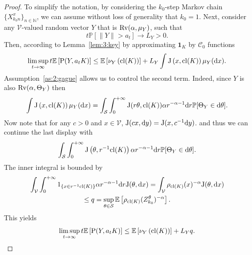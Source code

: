 \documentclass[preprint,12pt]{elsarticle}
\theoremstyle{definition}
\theoremstyle{remark}
\newcommand{\xbf}{{ x}}
\newcommand{\ybf}{{ y}}
\newcommand{\Xbf}{{ X}}
\newcommand{\Ybf}{{ Y}}
\newcommand{\Zbf}{{ Z}}
\newcommand{\1}{{\mathbf 1}}
\numberwithin{equation}{section}
\newcommand{\Ebb}{\mathbb{E}}  %
\newcommand{\Nbb}{\mathbb{N}}
\newcommand{\Pbb}{\mathbb{P}}
\newcommand{\ud}{{\rm d}}
\newcommand{\Prm}{{\rm P}}
\newcommand{\Krm}{{\rm J}}
\newcommand{\Rvrm}{{\rm Rv}}
\newcommand{\Vcal}{\mathcal{V}}
\newcommand{\Scal}{\mathcal{S}}
\begin{document}
  \begin{proof}
    To simplify the notation, by considering the $k_0$-step Markov chain 
    $\{\Xbf_{k_0n}^\xbf\}_{n \in \Nbb}$, we can assume without loss of 
    generality that $k_0=1$. Next, consider any $\Vcal$-valued random 
    vector $\Ybf$ that is $\Rvrm(\alpha, \mu_\Ybf)$, such that
    \begin{equation*}
      t \Pbb[\| \Ybf\| > a_t] \to L_\Ybf > 0.
    \end{equation*}
    Then, according to Lemma~\ref{lem:3:key} by approximating $\mathbf{1}_K$ 
	by $\mathcal{C}_0$ functions
	\begin{equation*}
      \limsup_{t \to \infty} t \Ebb\left[\Prm(\Ybf, a_tK)\right] \leq 
      \Ebb \left[\nu_{\Ybf}\left(\mathrm{cl}(K)\right) \right] +
      L_\Ybf \int \Krm\left(\xbf,\mathrm{cl}(K)\right) \mu_\Ybf(\ud \xbf).
	\end{equation*}
	Assumption~\ref{as:2:gague} allows us to control the second term. 
    Indeed, since $\Ybf$ is 
	also $\Rvrm(\alpha,\Theta_\Ybf)$ then
	\begin{equation*}
      \int \Krm\left(\xbf, \mathrm{cl}(K) \right) \mu_\Ybf(\ud \xbf) = 
      \int_\Scal \int_0^{+\infty} 
      \Krm(r \theta,\mathrm{cl}(K)) \alpha r^{-\alpha -1}\ud r 
      \Pbb[\Theta_\Ybf \in \ud \theta].
	\end{equation*}
    Now note that for any $c>0$ and 
	$\xbf \in \Vcal$, $\Krm(c\xbf,\ud \ybf) = \Krm(\xbf,c^{-1} \ud \ybf)$.
	and thus we can continue the last display 
	with
	\begin{equation*}
      \int_\Scal \int_0^{+\infty} 
      \Krm\left(\theta,r^{-1} \mathrm{cl}(K)\right) \alpha r^{-\alpha -1} \ud r 
      \Pbb[\Theta_\Ybf \in \ud \theta].
	\end{equation*}
	The inner integral is bounded by
	\begin{multline*}
      \int_\Vcal \int_0^{+\infty} 1_{\left\{ \xbf \in r^{-1} \mathrm{cl}(K)\right\}} 
      \alpha r^{-\alpha -1} \ud r \Krm(\theta,\ud \xbf)
      = \int_\Vcal \rho_{\operatorname{cl}(K)}(\xbf)^{-\alpha} \Krm(\theta,\ud \xbf) \\ 
      \leq q = \sup_{\theta \in \mathcal{S}} 
      \Ebb\left[\rho_{\operatorname{cl}(K)}(\Zbf_{k_0}^\theta)^{-\alpha}\right].
	\end{multline*}
	This yields
	\begin{equation*}
      \limsup_{t \to \infty} t \Ebb\left[\Prm(\Ybf, a_tK)\right] \leq 
      \Ebb \left[\nu_{\Ybf}\left(\mathrm{cl}(K)\right) \right] + L_\Ybf q.
	\end{equation*}

\end{proof}
\end{document}
